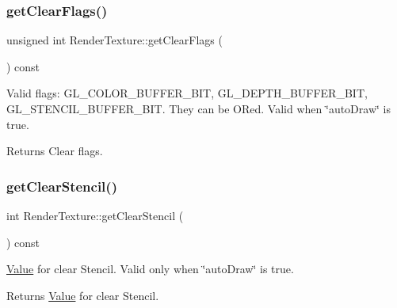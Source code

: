 \subsubsection{\texorpdfstring{get\+Clear\+Flags()}{getClearFlags()}\hspace{0.1cm}{\footnotesize\ttfamily [2/2]}}
{\footnotesize\ttfamily unsigned int Render\+Texture\+::get\+Clear\+Flags (\begin{DoxyParamCaption}{ }\end{DoxyParamCaption}) const\hspace{0.3cm}{\ttfamily [inline]}}

Valid flags\+: G\+L\+\_\+\+C\+O\+L\+O\+R\+\_\+\+B\+U\+F\+F\+E\+R\+\_\+\+B\+IT, G\+L\+\_\+\+D\+E\+P\+T\+H\+\_\+\+B\+U\+F\+F\+E\+R\+\_\+\+B\+IT, G\+L\+\_\+\+S\+T\+E\+N\+C\+I\+L\+\_\+\+B\+U\+F\+F\+E\+R\+\_\+\+B\+IT. They can be OR\textquotesingle{}ed. Valid when \char`\"{}auto\+Draw\char`\"{} is true.

\begin{DoxyReturn}{Returns}
Clear flags. 
\end{DoxyReturn}
\mbox{\label{classRenderTexture_a24a04ac4d778a70099d425c11df6cd02}} 
\subsubsection{\texorpdfstring{get\+Clear\+Stencil()}{getClearStencil()}\hspace{0.1cm}{\footnotesize\ttfamily [1/2]}}
{\footnotesize\ttfamily int Render\+Texture\+::get\+Clear\+Stencil (\begin{DoxyParamCaption}{ }\end{DoxyParamCaption}) const\hspace{0.3cm}{\ttfamily [inline]}}

\hyperlink{classValue}{Value} for clear Stencil. Valid only when \char`\"{}auto\+Draw\char`\"{} is true.

\begin{DoxyReturn}{Returns}
\hyperlink{classValue}{Value} for clear Stencil. 
\end{DoxyReturn}
\mbox{\label{classRenderTexture_a24a04ac4d778a70099d425c11df6cd02}} 
